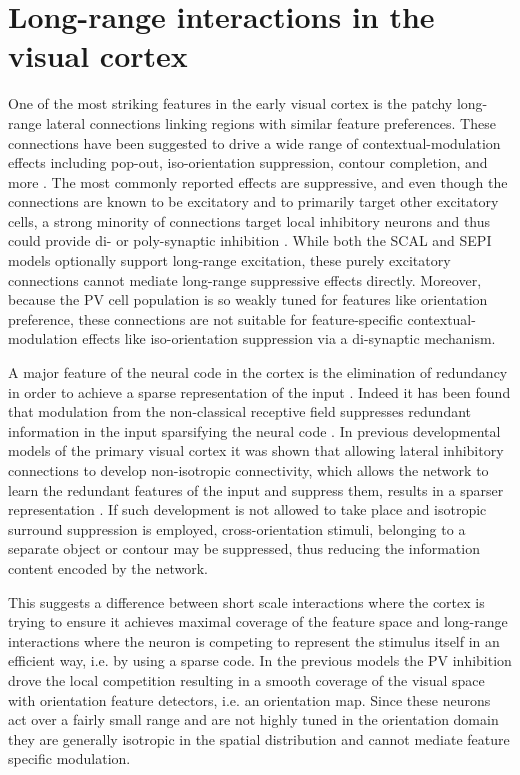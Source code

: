 \chapter{Long-range interactions in the visual cortex}

One of the most striking features in the early visual cortex is the
patchy long-range lateral connections linking regions
with similar feature preferences. These connections have been
suggested to drive a wide range of contextual-modulation effects
including pop-out, iso-orientation suppression, contour completion, and
more \citep{Gilbert1983, Hirsch1991, McGuire1991, Grinvald1994,
  Fitzpatrick2000, Hupe2001, Stettler2002}.  The most commonly
reported effects are suppressive, and even though the connections are
known to be excitatory and to primarily target other excitatory cells,
a strong minority of connections target local inhibitory neurons and
thus could provide di- or poly-synaptic inhibition
\citep{Hirsch1991,Weliky1995}.  While both the SCAL and SEPI models
optionally support long-range excitation, these purely excitatory connections
cannot mediate long-range suppressive effects directly.  Moreover,
because the PV cell population is so weakly tuned for features like
orientation preference, these connections are not suitable for
feature-specific contextual-modulation effects like iso-orientation 
suppression via a di-synaptic mechanism.

A major feature of the neural code in the cortex is the elimination of
redundancy in order to achieve a sparse representation of the input
\citep{barlow:comneuron89,Olshausen1996}. Indeed it has been found that modulation from
the non-classical receptive field suppresses redundant information in
the input sparsifying the neural code \citep{Vinje2000}. In previous
developmental models of the primary visual cortex it was shown that
allowing lateral inhibitory connections to develop non-isotropic
connectivity, which allows the network to learn the redundant features
of the input and suppress them, results in a sparser representation
\citep{Miikkulainen2005}. If such development is not allowed to take
place and isotropic surround suppression is employed,
cross-orientation stimuli, belonging to a separate object or contour
may be suppressed, thus reducing the information content encoded by
the network.

This suggests a difference between short scale interactions where the
cortex is trying to ensure it achieves maximal coverage of the feature
space and long-range interactions where the neuron is competing to
represent the stimulus itself in an efficient way, i.e. by using a
sparse code. In the previous models the PV inhibition drove the local
competition resulting in a smooth coverage of the visual space with
orientation feature detectors, i.e. an orientation map. Since these
neurons act over a fairly small range and are not highly tuned in the
orientation domain they are generally isotropic in the spatial
distribution and cannot mediate feature specific modulation.

